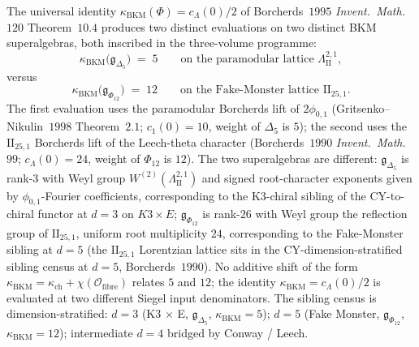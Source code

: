 \begin{remark}
\label{rem:k3e-cross-volume-kappa-BKM-five-vs-twelve}
The universal identity $\kappa_{\mathrm{BKM}}(\Phi) = c_\Lambda(0)/2$ of Borcherds~$1995$ \emph{Invent.~Math.}~$120$ Theorem~$10.4$ produces two distinct evaluations on two distinct BKM superalgebras, both inscribed in the three-volume programme:
\begin{equation}
\label{eq:k3e-two-kappa-BKM-siblings}
\kappa_{\mathrm{BKM}}\bigl(\mathfrak{g}_{\Delta_5}\bigr) \;=\; 5 \qquad \text{on the paramodular lattice } \Lambda^{2, 1}_{\mathrm{II}},
\end{equation}
versus
\begin{equation}
\kappa_{\mathrm{BKM}}\bigl(\mathfrak{g}_{\Phi_{12}}\bigr) \;=\; 12 \qquad \text{on the Fake-Monster lattice } \mathrm{II}_{25, 1}.
\end{equation}
The first evaluation uses the paramodular Borcherds lift of $2\phi_{0, 1}$ (Gritsenko--Nikulin~$1998$ Theorem~$2.1$; $c_1(0) = 10$, weight of $\Delta_5$ is $5$); the second uses the $\mathrm{II}_{25, 1}$ Borcherds lift of the Leech-theta character (Borcherds~$1990$ \emph{Invent.~Math.}~$99$; $c_\Lambda(0) = 24$, weight of $\Phi_{12}$ is $12$). The two superalgebras are different: $\mathfrak{g}_{\Delta_5}$ is rank-$3$ with Weyl group $W^{(2)}(\Lambda^{2, 1}_{\mathrm{II}})$ and signed root-character exponents given by $\phi_{0, 1}$-Fourier coefficients, corresponding to the K3-chiral sibling of the CY-to-chiral functor at $d = 3$ on $K3 \times E$; $\mathfrak{g}_{\Phi_{12}}$ is rank-$26$ with Weyl group the reflection group of $\mathrm{II}_{25, 1}$, uniform root multiplicity $24$, corresponding to the Fake-Monster sibling at $d = 5$ (the $\mathrm{II}_{25, 1}$ Lorentzian lattice sits in the CY-dimension-stratified sibling census at $d = 5$, Borcherds~$1990$). No additive shift of the form $\kappa_{\mathrm{BKM}} = \kappa_{\mathrm{ch}} + \chi(\mathcal{O}_{\mathrm{fibre}})$ relates $5$ and $12$; the identity $\kappa_{\mathrm{BKM}} = c_\Lambda(0)/2$ is evaluated at two different Siegel input denominators. The sibling census is dimension-stratified: $d = 3$ (K3 $\times$ E, $\mathfrak{g}_{\Delta_5}$, $\kappa_{\mathrm{BKM}} = 5$); $d = 5$ (Fake Monster, $\mathfrak{g}_{\Phi_{12}}$, $\kappa_{\mathrm{BKM}} = 12$); intermediate $d = 4$ bridged by Conway / Leech.
\end{remark}


